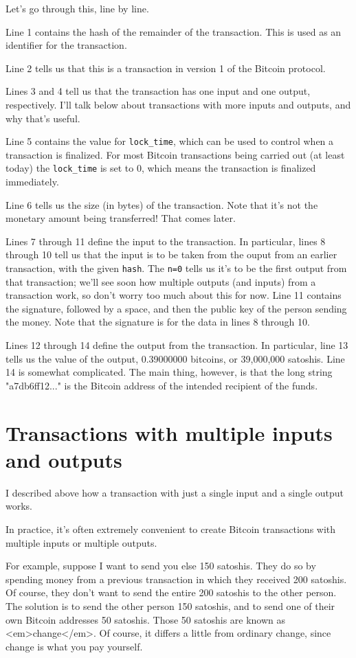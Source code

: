 \documentclass[12pt]{book}
\newcounter{example}[chapter]
\begin{document}
Let's go through this, line by line.

Line 1 contains the hash of the remainder of the transaction.  This is
used as an identifier for the transaction.

Line 2 tells us that this is a transaction in version 1 of the Bitcoin
protocol.

Lines 3 and 4 tell us that the transaction has one input and one
output, respectively.  I'll talk below about transactions with more
inputs and outputs, and why that's useful. 

Line 5 contains the value for \verb|lock_time|, which can be used to
control when a transaction is finalized.  For most Bitcoin
transactions being carried out (at least today) the \verb|lock_time|
is set to 0, which means the transaction is finalized immediately.

Line 6 tells us the size (in bytes) of the transaction.  Note that
it's not the monetary amount being transferred!  That comes later.

Lines 7 through 11 define the input to the transaction.  In
particular, lines 8 through 10 tell us that the input is to be taken
from the ouput from an earlier transaction, with the given
\verb|hash|.  The \verb|n=0| tells us it's to be the first output from
that transaction; we'll see soon how multiple outputs (and inputs)
from a transaction work, so don't worry too much about this for now.
Line 11 contains the signature, followed by a space, and then the
public key of the person sending the money.  Note that the signature
is for the data in lines 8 through 10. 

Lines 12 through 14 define the output from the transaction.  In
particular, line 13 tells us the value of the output, 0.39000000
bitcoins, or 39,000,000 satoshis.  Line 14 is somewhat complicated.
The main thing, however, is that the long string "a7db6ff12..." is the
Bitcoin address of the intended recipient of the funds.

\section{Transactions with multiple inputs and outputs}

I described above how a transaction with just a single input and a
single output works.

In practice, it's often extremely convenient to create Bitcoin
transactions with multiple inputs or multiple outputs.

For example, suppose I want to send you else 150 satoshis.  They do so
by spending money from a previous transaction in which they received
200 satoshis.  Of course, they don't want to send the entire 200
satoshis to the other person.  The solution is to send the other
person 150 satoshis, and to send one of their own Bitcoin addresses 50
satoshis.  Those 50 satoshis are known as <em>change</em>.  Of course,
it differs a little from ordinary change, since change is what you pay
yourself.
\end{document}
